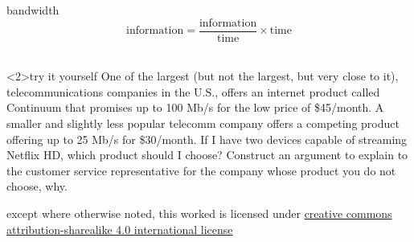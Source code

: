 \documentclass[10pt,t,svgnames]{beamer}
\begin{document}
  \begin{frame}{bandwidth}
    $$\textrm{information}=\frac{\textrm{information}}{\textrm{time}}\times\textrm{time}$$\\[2\baselineskip]

    \begin{block}<2>{try it yourself}
      One of the largest (but not the largest, but very close to it),
      telecommunications companies in the U.S., offers an internet product
      called Continuum that promises up to 100 Mb/s for the low price of
      \$45/month. A smaller and slightly less popular telecomm company offers a
      competing product offering up to 25 Mb/s for \$30/month. If I have two
      devices capable of streaming Netflix HD, which product should I choose?
      Construct an argument to explain to the customer service representative
      for the company whose product you do not choose, why.
    \end{block}

  \end{frame}

  \appendix

  \begin{frame}[c]
    \begin{center}\ccbysa\end{center}

    except where otherwise noted, this worked is licensed under
    \href{http://creativecommons.org/licenses/by-sa/4.0/}{creative commons
    attribution-sharealike 4.0 international license}
  \end{frame}
\end{document}
